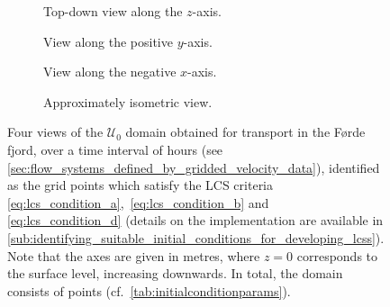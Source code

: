 \begin{figure}[htpb]
    \centering
    \hspace*{\fill}
    \begin{subfigure}[b]{0.43\textwidth}
        \centering
        \caption[]{{\small Top-down view along the $z$-axis.}}
        \label{fig:fjord_abd_z}
    \end{subfigure}\hfill%
    \begin{subfigure}[b]{0.43\textwidth}
        \centering
        \caption[]{{\small View along the positive $y$-axis.}}
        \label{fig:fjord_abd_y}
    \end{subfigure}
    \hspace*{\fill}

    \hspace*{\fill}
    \begin{subfigure}[b]{0.43\textwidth}
        \centering
        \caption[]{{\small View along the negative $x$-axis.}}
        \label{fig:fjord_abd_x}
    \end{subfigure}\hfill%
    \begin{subfigure}[b]{0.43\textwidth}
        \centering
        \caption[]{{\small Approximately isometric view.}}
        \label{fig:fjord_abd_isometric}
    \end{subfigure}%
    \hspace*{\fill}
    \caption[Four views of the $\mathcal{U}_{0}$ domain obtained for transport
    in the Førde fjord]
    {
        Four views of the $\mathcal{U}_{0}$ domain obtained for transport in
        the Førde fjord, over a time interval of  hours
        (see \cref{sec:flow_systems_defined_by_gridded_velocity_data}),
        identified as the grid points which satisfy the
        LCS criteria \eqref{eq:lcs_condition_a},~\eqref{eq:lcs_condition_b} and~
        \eqref{eq:lcs_condition_d} (details on the implementation are available
        in
        \cref{sub:identifying_suitable_initial_conditions_for_developing_lcss}).
        Note that the axes are given in metres, where $z=0$ corresponds to
        the surface level, increasing downwards. In total, the domain consists
        of  points (cf.\ \cref{tab:initialconditionparams}).
}
    \label{fig:fjord_abd}
\end{figure}

